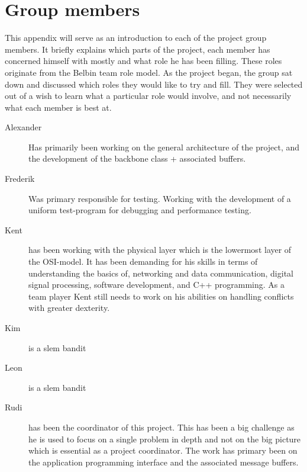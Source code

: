 \chapter{Group members}\label{app:members}
This appendix will serve as an introduction to each of the project group members. It briefly explains which parts of the project, each member has concerned himself with mostly and what role he has been filling. These roles originate from the Belbin team role model. As the project began, the group sat down and discussed which roles they would like to try and fill. They were selected out of a wish to learn what a particular role would involve, and not necessarily what each member is best at.

\begin{description}
\item[Alexander] Has primarily been working on the general architecture of the project, and the development of the backbone class + associated buffers.
\item[Frederik] Was primary responsible for testing. Working with the development of a uniform test-program for debugging and performance testing.
\item[Kent]
has been working with the physical layer which is the lowermost layer of the OSI-model. It has been demanding for his skills in terms of understanding the basics of, networking and data communication, digital signal processing, software development, and C++ programming. As a team player Kent still needs to work on his abilities on handling conflicts with greater dexterity.
\item[Kim] is a slem bandit
\item[Leon] is a slem bandit
\item[Rudi] has been the coordinator of this project. This has been a big challenge as he is used to focus on a single problem in depth and not on the big picture which is essential as a project coordinator. The work has primary been on the application programming interface and the associated message buffers.
\end{description}
